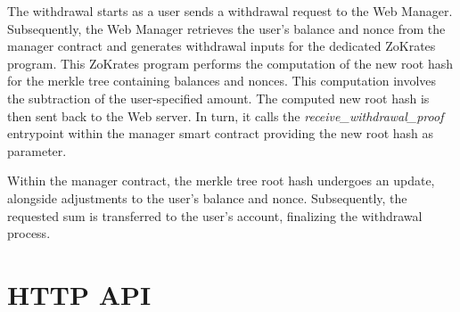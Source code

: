 The withdrawal starts as a user sends a withdrawal request to the Web Manager. Subsequently, the Web Manager retrieves the user's balance and nonce from the manager contract and generates withdrawal inputs for the dedicated ZoKrates program. This ZoKrates program performs the computation of the new root hash for the merkle tree containing balances and nonces. This computation involves the subtraction of the user-specified amount. The computed new root hash is then sent back to the Web server. In turn, it calls the \textit{receive\_withdrawal\_proof} entrypoint within the manager smart contract providing the new root hash as parameter.

Within the manager contract, the merkle tree root hash undergoes an update, alongside adjustments to the user's balance and nonce. Subsequently, the requested sum is transferred to the user's account, finalizing the withdrawal process.

\section{HTTP API}

